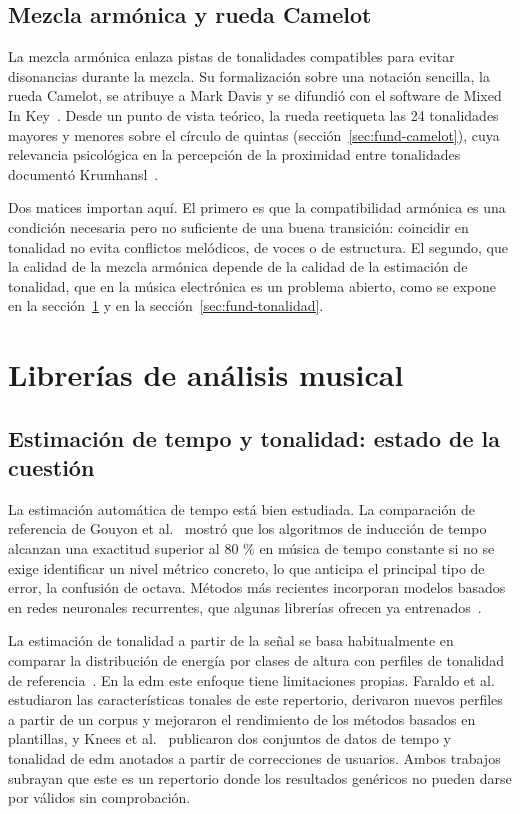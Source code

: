 \subsection{Mezcla armónica y rueda Camelot}

La mezcla armónica enlaza pistas de tonalidades compatibles para evitar disonancias durante la mezcla. Su formalización sobre una notación sencilla, la rueda Camelot, se atribuye a Mark Davis y se difundió con el software de Mixed In Key~\cite{mixedinkey_camelot}. Desde un punto de vista teórico, la rueda reetiqueta las 24 tonalidades mayores y menores sobre el círculo de quintas (sección~\ref{sec:fund-camelot}), cuya relevancia psicológica en la percepción de la proximidad entre tonalidades documentó Krumhansl~\cite{krumhansl1990cognitive}.

Dos matices importan aquí. El primero es que la compatibilidad armónica es una condición necesaria pero no suficiente de una buena transición: coincidir en tonalidad no evita conflictos melódicos, de voces o de estructura. El segundo, que la calidad de la mezcla armónica depende de la calidad de la estimación de tonalidad, que en la música electrónica es un problema abierto, como se expone en la sección~\ref{sec:eda-librerias} y en la sección~\ref{sec:fund-tonalidad}.

\section{Librerías de análisis musical}
\label{sec:eda-librerias}

\subsection{Estimación de tempo y tonalidad: estado de la cuestión}

La estimación automática de tempo está bien estudiada. La comparación de referencia de Gouyon et al.~\cite{gouyon2006experimental} mostró que los algoritmos de inducción de tempo alcanzan una exactitud superior al 80 \% en música de tempo constante si no se exige identificar un nivel métrico concreto, lo que anticipa el principal tipo de error, la confusión de octava. Métodos más recientes incorporan modelos basados en redes neuronales recurrentes, que algunas librerías ofrecen ya entrenados~\cite{bock2016madmom}.

La estimación de tonalidad a partir de la señal se basa habitualmente en comparar la distribución de energía por clases de altura con perfiles de tonalidad de referencia~\cite{gomez2006tonal}. En la \acs{edm} este enfoque tiene limitaciones propias. Faraldo et al.~\cite{faraldo2016key} estudiaron las características tonales de este repertorio, derivaron nuevos perfiles a partir de un corpus y mejoraron el rendimiento de los métodos basados en plantillas, y Knees et al.~\cite{knees2015giantsteps} publicaron dos conjuntos de datos de tempo y tonalidad de \acs{edm} anotados a partir de correcciones de usuarios. Ambos trabajos subrayan que este es un repertorio donde los resultados genéricos no pueden darse por válidos sin comprobación.

